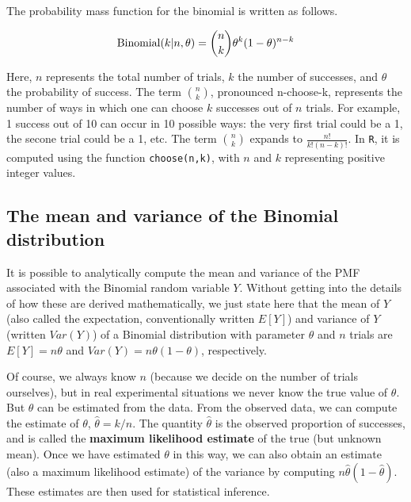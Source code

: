 \documentclass[12pt,]{krantz}
\begin{document}
The probability mass function for the binomial is written as follows.

\begin{equation}
\hbox{Binomial}(k|n,\theta) = 
\binom{n}{k} \theta^{k} (1-\theta)^{n-k}
\end{equation}

Here, \(n\) represents the total number of trials, \(k\) the number of successes, and \(\theta\) the probability of success. The term \(\binom{n}{k}\), pronounced n-choose-k, represents the number of ways in which one can choose \(k\) successes out of \(n\) trials. For example, 1 success out of 10 can occur in 10 possible ways: the very first trial could be a 1, the secone trial could be a 1, etc.
The term \(\binom{n}{k}\) expands to \(\frac{n!}{k!(n-k)!}\). In \texttt{R}, it is computed using the function \texttt{choose(n,k)}, with \(n\) and \(k\) representing positive integer values.

\hypertarget{the-mean-and-variance-of-the-binomial-distribution}{%
\subsection{The mean and variance of the Binomial distribution}\label{the-mean-and-variance-of-the-binomial-distribution}}

It is possible to analytically compute the mean and variance of the PMF associated with the Binomial random variable \(Y\). Without getting into the details of how these are derived mathematically, we just state here that the mean of \(Y\) (also called the expectation, conventionally written \(E[Y]\)) and variance of \(Y\) (written \(Var(Y)\)) of a Binomial distribution with parameter \(\theta\) and \(n\) trials are \(E[Y] = n\theta\) and \(Var(Y) = n\theta (1-\theta)\), respectively.

Of course, we always know \(n\) (because we decide on the number of trials ourselves), but in real experimental situations we never know the true value of \(\theta\). But \(\theta\) can be estimated from the data. From the observed data, we can compute the estimate of \(\theta\), \(\hat \theta=k/n\). The quantity \(\hat \theta\) is the observed proportion of successes, and is called the \textbf{maximum likelihood estimate} of the true (but unknown mean). Once we have estimated \(\theta\) in this way, we can also obtain an estimate (also a maximum likelihood estimate) of the variance by computing \(n\hat\theta (1-\hat\theta)\). These estimates are then used for statistical inference.
\end{document}
